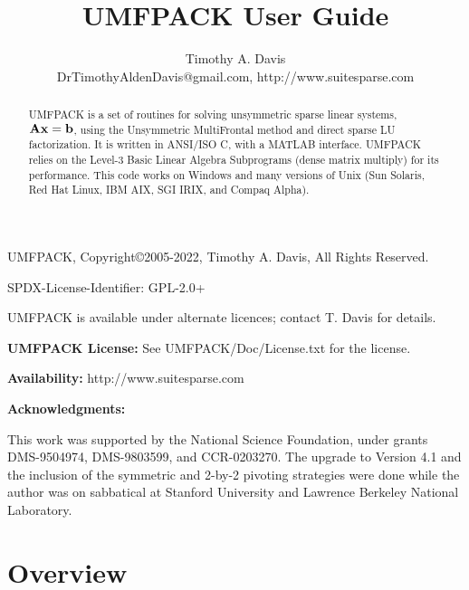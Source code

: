\documentclass[11pt]{article}
\newcommand{\m}[1]{{\bf{#1}}}       %
\begin{document}
\author{Timothy A. Davis \\
DrTimothyAldenDavis@gmail.com, http://www.suitesparse.com}
\title{UMFPACK User Guide}

\maketitle

\begin{abstract}
    UMFPACK is a set of routines for solving unsymmetric sparse linear
    systems, $\m{Ax}=\m{b}$, using the Unsymmetric MultiFrontal method
    and direct sparse LU factorization.  It is written in ANSI/ISO C, with a
    MATLAB interface.  UMFPACK relies on the Level-3 Basic
    Linear Algebra Subprograms (dense matrix multiply) for its performance.
    This code works on Windows and many versions of Unix (Sun Solaris,
    Red Hat Linux, IBM AIX, SGI IRIX, and Compaq Alpha).
\end{abstract}

UMFPACK, Copyright\copyright 2005-2022, Timothy A. Davis, All Rights Reserved.

SPDX-License-Identifier: GPL-2.0+

UMFPACK is available under alternate licences; contact T. Davis for details.

{\bf UMFPACK License:} See UMFPACK/Doc/License.txt for the license.

{\bf Availability:}
    http://www.suitesparse.com

{\bf Acknowledgments:}

    This work was supported by the National Science Foundation, under
    grants DMS-9504974, DMS-9803599, and CCR-0203270.
    The upgrade to Version 4.1 and the inclusion of the
    symmetric and 2-by-2 pivoting strategies
    were done while the author was on sabbatical at
    Stanford University and Lawrence Berkeley National Laboratory.

\newpage

\tableofcontents

\newpage
\section{Overview}
\end{document}
